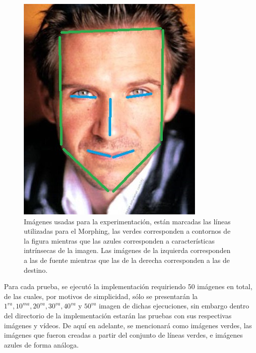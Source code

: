 \documentclass[conference]{IEEEtran}
\begin{document}
\begin{figure}[H]
\begin{multicols}{2}
    \includegraphics[height=0.65\linewidth]{faces/2 lines.jpg} \par
\end{multicols}
\caption{Imágenes usadas para la experimentación, están marcadas las líneas utilizadas para el Morphing, las verdes corresponden a contornos de la figura mientras que las azules corresponden a características intrínsecas de la imagen. Las imágenes de la izquierda corresponden a las de fuente mientras que las de la derecha corresponden a las de destino.}
\end{figure}
	
	Para cada prueba, se ejecutó la implementación requiriendo 50 imágenes en total, de las cuales, por motivos de simplicidad, sólo se presentarán la $1^{ra}, 10^{ma}, 20^{va}, 30^{va}, 40^{va}$ y $50^{va}$ imagen de dichas ejecuciones, sin embargo dentro del directorio de la implementación estarán las pruebas con sus respectivas imágenes y vídeos.
	De aquí en adelante, se mencionará como imágenes verdes, las imágenes que fueron creadas a partir del conjunto de líneas verdes, e imágenes azules de forma análoga. 
\end{document}
